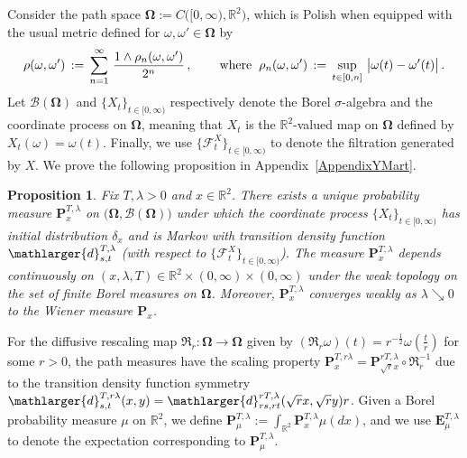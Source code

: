 \documentclass[10pt]{article}
\numberwithin{equation}{section}
\newtheorem{proposition}[theorem]{Proposition}
\theoremstyle{definition}
\newcommand{\R}{{\mathbb R}}
\begin{document}
  Consider the path space $\boldsymbol{\Omega}:=C\big([0,\infty), \R^2\big)  $, which is  Polish when equipped with the usual metric defined for $\omega,\omega'\in \boldsymbol{\Omega}$ by
  $$\rho(\omega,\omega')\,:=\,\sum_{n=1}^{\infty}\,\frac{1\wedge \rho_n(\omega,\omega')}{2^n}\,,\,\hspace{.7cm}\text{where}\hspace{.2cm} \rho_n(\omega,\omega')\,:=\,\sup_{t\in [0,n]}\,\big|\omega(t)-\omega'(t)\big| \,.  $$ 
  Let $\mathscr{B}(\boldsymbol{\Omega})$ and $\{X_t \}_{t\in [0,\infty)}$ respectively denote  the Borel $\sigma$-algebra and the coordinate process on $\boldsymbol{\Omega}$, meaning that $X_t$ is the $\R^2$-valued map on $\boldsymbol{\Omega} $ defined by $X_t(\omega)=\omega(t)$.  Finally, we use $\{ \mathscr{F}^{X}_t\}_{t\in [0,\infty)}$ to denote the filtration generated by $X$. We  prove  the following proposition in Appendix~\ref{AppendixYMart}.
\begin{proposition}\label{PropCP} Fix $T,\lambda >0$ and   $x\in \R^2$.  There exists a unique  probability measure  $\mathbf{P}^{T,\lambda}_{x}  $ on  $\big(\boldsymbol{\Omega},\mathscr{B}(\boldsymbol{\Omega})  \big)$ under which the coordinate process $\{X_t \}_{t\in [0,\infty)}$ has initial distribution $\delta_x$ and is  Markov with transition density function  $   \mathlarger{d}_{s,t}^{T,\lambda  } $ (with respect to   $\{\mathscr{F}^{X}_t \}_{t\in [0,\infty)}$).
The measure $ \mathbf{P}^{T,\lambda }_{x}$ depends continuously on $(x,\lambda ,T)\in \R^2\times (0,\infty)\times (0,\infty)$ under the weak topology on the set of finite Borel measures on $\boldsymbol{\Omega}$.   Moreover,  $ \mathbf{P}^{T,\lambda }_{x}$ converges weakly as $\lambda\searrow 0$ to the Wiener measure $ \mathbf{P}_{x}$. 
\end{proposition}
For  the diffusive rescaling map $\mathfrak{R}_r:\boldsymbol{\Omega}\rightarrow \boldsymbol{\Omega}$ given by $(\mathfrak{R}_r\omega)(t)= r^{-\frac{1}{2}}\omega(\frac{t}{r})$ for some $r>0$, the path measures have the scaling property $\mathbf{P}^{ T, r\lambda}_{ x} =\mathbf{P}^{r T,\lambda}_{\sqrt{r} x}\circ \mathfrak{R}_r^{-1}  $ due to the transition density function symmetry $\mathlarger{d}_{s,t}^{T ,r\lambda }(x,y)=\mathlarger{d}_{r s,r t}^{r T ,\lambda }(\sqrt{r} x,\sqrt{r} y)r$.  Given a Borel probability measure $\mu$ on $\R^2$, we define $\mathbf{P}^{T,\lambda}_{\mu}:=\int_{\R^2}\mathbf{P}^{T,\lambda}_{x}\mu(dx)  $, and we use $\mathbf{E}^{T,\lambda}_{\mu}$ to  denote the  expectation corresponding to $\mathbf{P}^{T,\lambda }_{\mu}$. 
\end{document}

